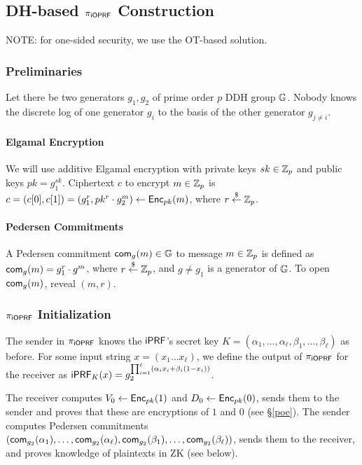 \subsection{DH-based ${\pi_{\mathsf{i}\mathsf{OPRF}}}$ Construction}
NOTE: for one-sided security, we use the OT-based solution.


\subsubsection{Preliminaries}
Let there be two generators $g_1,g_2$ of prime order $p$ DDH group
$\mathbb{G}$. Nobody knows the discrete log of one generator $g_i$ to the
basis of the other generator $g_{j\neq{}i}$.

\paragraph{Elgamal Encryption}
We will use additive Elgamal encryption with private keys $sk\in\mathbb{Z}_p$
and public keys $pk=g_1^{sk}$. Ciphertext $c$ to encrypt $m\in\mathbb{Z}_p$ is
$c=(c[0],c[1])=(g_1^r,pk^r\cdot{}g_2^m)\leftarrow{\mathsf{Enc}}_{pk}(m)$, where
$r\stackrel{\$}{\leftarrow}\mathbb{Z}_p$.

\paragraph{Pedersen Commitments}
A Pedersen commitment $\mathsf{com}_{g}(m)\in\mathbb{G}$ to message $m\in\mathbb{Z}_p$ is defined as
$\mathsf{com}_{g}(m)=g_1^r\cdot{}g^m$, where $r\stackrel{\$}{\leftarrow}\mathbb{Z}_p$, and $g\neq{}g_1$ is
a generator of $\mathbb{G}$.  To open $\mathsf{com}_{g}(m)$, reveal $(m,r)$.


\subsubsection{${\pi_{\mathsf{i}\mathsf{OPRF}}}$ Initialization}
The sender in ${\pi_{\mathsf{i}\mathsf{OPRF}}}$ knows the $\mathsf{i}\mathsf{PRF}$'s secret key
$K=(\alpha_1,\ldots,\alpha_\ell,\beta_1,\ldots,\beta_\ell)$ as before. For some input
string $x=(x_1\ldots{}x_\ell)$, we define the output of ${\pi_{\mathsf{i}\mathsf{OPRF}}}$ for
the receiver as
$\mathsf{i}\mathsf{PRF}_K(x)=g_2^{\prod_{i=1}^{\ell}(\alpha_i{}x_i+\beta_i(1-x_i))}$.

The receiver computes $V_0 \leftarrow{\mathsf{Enc}}_{pk}(1)$ and
$D_0\leftarrow{\mathsf{Enc}}_{pk}(0)$, sends them to the sender and proves that
these are encryptions of $1$ and $0$ (see \S\ref{poe}). The sender computes Pedersen commitments
$(\mathsf{com}_{g_2}(\alpha_1),\ldots,\mathsf{com}_{g_2}(\alpha_\ell),\mathsf{com}_{g_2}(\beta_1),\ldots,\mathsf{com}_{g_2}(\beta_\ell))$,
sends them to the receiver, and proves knowledge of plaintexts in ZK
(see below).

